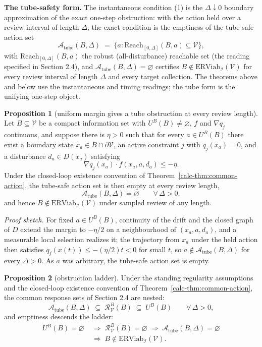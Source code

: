 \documentclass[10pt,twocolumn]{article}
\theoremstyle{definition}
\newtheorem{proposition}{Proposition}
\begin{document}
\textbf{The tube-safety form.} The instantaneous condition (1) is the
\(\Delta \downarrow 0\) boundary approximation of the exact one-step
obstruction: with the action held over a review interval of length
\(\Delta\), the exact condition is the emptiness of the tube-safe action
set
\[\mathcal{A}_{\mathrm{tube}}(B, \Delta) \;=\; \Big\{ a : \mathrm{Reach}_{[0,\Delta]}(B, a) \subseteq \mathcal{V} \Big\},\]
with \(\mathrm{Reach}_{[0,\Delta]}(B, a)\) the robust (all-disturbance) reachable set (the reading specified in Section 2.4),
and \(\mathcal{A}_{\mathrm{tube}}(B, \Delta) = \varnothing\) certifies
\(B \notin \mathrm{ERViab}_{\mathcal{I}}(\mathcal{V})\) for every review
interval of length \(\Delta\) and every target collection. The theorems
above and below use the instantaneous and timing readings; the tube form
is the unifying one-step object.

\begin{proposition}[uniform margin gives a tube obstruction at every review length]\label{calc-prop:uniform-margin}
Let \(B\subseteq\mathcal V\) be a compact information set with
\(U^B(B)\neq\varnothing\), \(f\) and \(\nabla q_j\) continuous, and
suppose there is \(\eta>0\) such that for every \(a\in U^B(B)\) there
exist a boundary state \(x_a\in B\cap\partial\mathcal V\), an active
constraint \(j\) with \(q_j(x_a)=0\), and a disturbance \(d_a\in D(x_a)\)
satisfying
\[\nabla q_j(x_a)\cdot f(x_a,a,d_a) \le -\eta.\]
Under the closed-loop existence convention of
Theorem~\ref{calc-thm:common-action}, the tube-safe action set is then empty
at every review length,
\[\mathcal{A}_{\mathrm{tube}}(B,\Delta)=\varnothing \qquad \forall\,\Delta>0,\]
and hence \(B\notin\mathrm{ERViab}_{\mathcal I}(\mathcal V)\) under
sampled review of any length.
\end{proposition}

\emph{Proof sketch.} For fixed \(a \in U^B(B)\), continuity of the drift and the closed graph of \(D\) extend the margin to \(-\eta/2\) on a neighbourhood of \((x_a, a, d_a)\), and a measurable local selection realizes it; the trajectory from \(x_a\) under the held action then satisfies \(q_j(x(t)) \le -(\eta/2) t < 0\) for small \(t\), so \(a \notin \mathcal{A}_{\mathrm{tube}}(B, \Delta)\) for every \(\Delta > 0\). As \(a\) was arbitrary, the tube-safe action set is empty.

\begin{proposition}[obstruction ladder]\label{calc-prop:ladder}
Under the standing regularity assumptions and the closed-loop existence
convention of Theorem~\ref{calc-thm:common-action}, the common response sets
of Section 2.4 are nested:
\[\mathcal{A}_{\mathrm{tube}}(B,\Delta) \;\subseteq\; \mathcal{R}_{\mathcal{V}}^B(B) \;\subseteq\; U^B(B) \qquad \forall\,\Delta>0,\]
and emptiness descends the ladder:
\[
\begin{aligned}
U^B(B)=\varnothing \;&\Longrightarrow\; \mathcal{R}_{\mathcal{V}}^B(B)=\varnothing \;\Longrightarrow\; \mathcal{A}_{\mathrm{tube}}(B,\Delta)=\varnothing \\
&\Longrightarrow\; B\notin\mathrm{ERViab}_{\mathcal{I}}(\mathcal{V}).
\end{aligned}
\]
\end{proposition}
\end{document}

